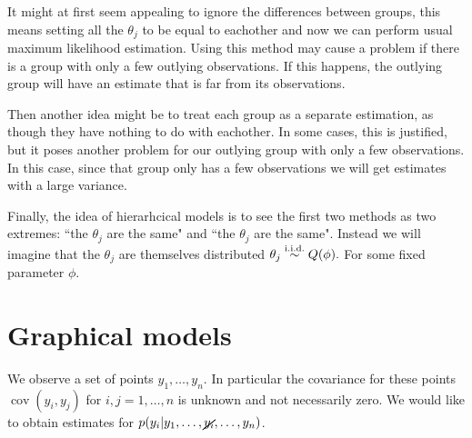 \documentclass{scrartcl}
\DeclareMathOperator{\cov}{cov}
\newcommand{\iid}{\stackrel{\textmd{i.i.d.}}{\sim}}
\begin{document}
It might at first seem appealing to ignore the differences between groups, this
means setting all the $\theta_j$ to be equal to eachother and now we can
perform usual maximum likelihood estimation. Using this method may cause a
problem if there is a group with only a few outlying observations. If this
happens, the outlying group will have an estimate that is far from its
observations.

Then another idea might be to treat each group as a separate estimation, as
though they have nothing to do with eachother. In some cases, this is
justified, but it poses another problem for our outlying group with only a few
observations. In this case, since that group only has a few observations we
will get estimates with a large variance.

Finally, the idea of hierarhcical models is to see the first two methods as two
extremes: ``the $\theta_j$ are the same" and ``the $\theta_j$ are the same".
Instead we will imagine that the $\theta_j$ are themselves distributed $\theta_j \iid Q(\phi).$ For some fixed parameter $\phi.$

\section{Graphical models}
We observe a set of points $y_1, \dots, y_n$.
In particular the covariance for these points $\cov(y_i, y_j)$ for $i,j = 1,\dots,
	n$ is unknown and not necessarily zero.
We would like to obtain estimates for $p(y_i | y_1,\dots, \cancel{y_i},\dots, y_n)$.
\end{document}
